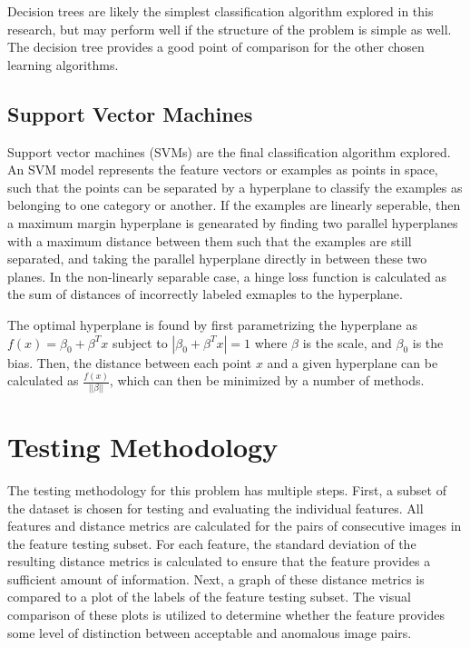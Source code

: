 Decision trees are likely the simplest classification algorithm explored in this research, but may perform well if the structure of the problem is simple as well.
The decision tree provides a good point of comparison for the other chosen learning algorithms.



\subsection{Support Vector Machines}

Support vector machines (SVMs) are the final classification algorithm explored.
An SVM model represents the feature vectors or examples as points in space, such that the points can be separated by a hyperplane to classify the examples as belonging to one category or another.
If the examples are linearly seperable, then a maximum margin hyperplane is genearated by finding two parallel hyperplanes with a maximum distance between them such that the examples are still separated, and taking the parallel hyperplane directly in between these two planes.
In the non-linearly separable case, a hinge loss function is calculated as the sum of distances of incorrectly labeled exmaples to the hyperplane.

The optimal hyperplane is found by first parametrizing the hyperplane as $f(x) = \beta_0 + \beta^Tx$ subject to $|\beta_0 + \beta^Tx| =1$ where $\beta$ is the scale, and $\beta_0$ is the bias.
Then, the distance between each point $x$ and a given hyperplane can be calculated as $\frac{f(x)}{||\beta||}$, which can then be minimized by a number of methods.



\section{Testing Methodology}

The testing methodology for this problem has multiple steps.
First, a subset of the dataset is chosen for testing and evaluating the individual features.
All features and distance metrics are calculated for the pairs of consecutive images in the feature testing subset.
For each feature, the standard deviation of the resulting distance metrics is calculated to ensure that the feature provides a sufficient amount of information.
Next, a graph of these distance metrics is compared to a plot of the labels of the feature testing subset.
The visual comparison of these plots is utilized to determine whether the feature provides some level of distinction between acceptable and anomalous image pairs.


